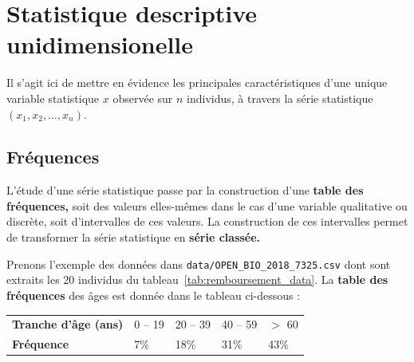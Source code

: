 \section{Statistique descriptive unidimensionelle}
Il s'agit ici de mettre en évidence les principales caractéristiques d'une
unique variable statistique $x$ observée sur $n$ individus, à travers la série
statistique $(x_1, x_2, \dots, x_n).$

\subsection{Fréquences}
L'étude d'une série statistique passe par la construction d'une \textbf{table
	des fréquences,} soit des valeurs elles-mêmes dans le cas d'une variable
qualitative ou discrète, soit d'intervalles de ces valeurs. La construction de
ces intervalles permet de transformer la série statistique en \textbf{série
	classée.}

\begin{exemple}
	Prenons l'exemple des données dans
	\texttt{data/OPEN\_BIO\_2018\_7325.csv} dont sont extraits les 20 individus
	du tableau~\ref{tab:remboursement_data}. La \textbf{table des fréquences}
	des âges est donnée dans le tableau ci-dessous : %
		\vspace*{-.25em}
		\begin{table}[H]\captionsetup{labelformat=empty} 
			\centering
			\begin{tabular}{lb{1.5cm}b{1.5cm}b{1.5cm}b{1.5cm}} \toprule[1.5pt] 
				\textbf{Tranche d'âge (ans)}   & 0 -- 19 & 20 -- 39  & 40 -- 59  & $>$ 60    \\
				\textbf{Fréquence}             & 7\%     & 18\%      & 31\%      & 43\%      \\
				\bottomrule[1.5pt]
			\end{tabular}
		\end{table}
		\vspace*{-1em}
\end{exemple}

